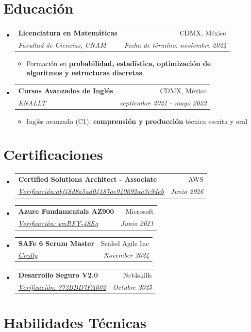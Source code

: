 \documentclass[letterpaper,11pt]{article}
\makeatletter
\newcommand{\resumeItem}[1]{%
	\item\small{
		#1
	}
}
\newcommand{\resumeSubheading}[4]{
	\vspace{3pt}\item%
	\begin{tabular*}{0.97\textwidth}[t]{l@{\extracolsep{\fill}}r}
		\textbf{#1} & #2 \\
		\textit{\small#3} & \textit{\small #4} \\
	\end{tabular*}\vspace{-5pt}
}
\newcommand{\resumeSubHeadingListStart}{\begin{itemize}[leftmargin=*]}
\newcommand{\resumeSubHeadingListEnd}{\end{itemize}}
\newcommand{\resumeItemListStart}{\begin{itemize}}
\newcommand{\resumeItemListEnd}{\end{itemize}\vspace{-5pt}}
\makeatother
\begin{document}
		\section{Educación}
		\resumeSubHeadingListStart
		\resumeSubheading
		{Licenciatura en Matemáticas}{CDMX, México}
		{Facultad de Ciencias, UNAM}{Fecha de término: noviembre 2024}
		\resumeItemListStart
		\resumeItem{Formación en \textbf{probabilidad, estadística, optimización de algoritmos y estructuras discretas}.}
		\resumeItemListEnd
		\resumeSubheading
		{Cursos Avanzados de Inglés}{CDMX, México}
		{ENALLT}{septiembre 2021 - mayo 2022}
		\resumeItemListStart
		\resumeItem{Inglés avanzado (C1): \textbf{comprensión y producción} técnica escrita y oral}
		\resumeItemListEnd
		\resumeSubHeadingListEnd
		
		\section{Certificaciones}
		
		\begin{minipage}[t]{0.48\textwidth}
			
			\resumeSubHeadingListStart
			\resumeSubheading{Certified Solutions Architect - Associate}{AWS}
			{\href{https://aws.amazon.com/verification}{\color{urlcolor}Verificación:abf48d8a5ad04187ae940692aa3e9deb }}{ Junio 2026}
			
			\resumeSubheading{Azure Fundamentals AZ900}{Microsoft}
			{\href{https://www.certiport.com/portal/Pages/PrintTranscriptInfo.aspx?action=Cert\&id=414\&cvid=89qXn0LJxMFhiYjy6V0ZaQ==}{\color{urlcolor}Verificación: wnRFY-48Eq}}{Junio 2021}
			\resumeSubHeadingListEnd
			
		\end{minipage}
		\hfill
		\begin{minipage}[t]{0.48\textwidth}
			
			\resumeSubHeadingListStart
			\resumeSubheading{SAFe 6 Scrum Master}{Scaled Agile Inc}
			{\href{https://www.credly.com/badges/14e3126c-fe1d-4d4e-8fcf-6d3c6702ccb0/public_url}{\color{urlcolor}Credly}}{November 2024}
			
			\resumeSubheading{Desarrollo Seguro V2.0}{Net4skills}
			{\href{https://wallet.xertify.co/certificates/372BBD7FA004}{\color{urlcolor}Verificación: 372BBD7FA002}}{Octubre 2025}
			\resumeSubHeadingListEnd

		\end{minipage}
		
		\section{Habilidades Técnicas}
		
\end{document}
